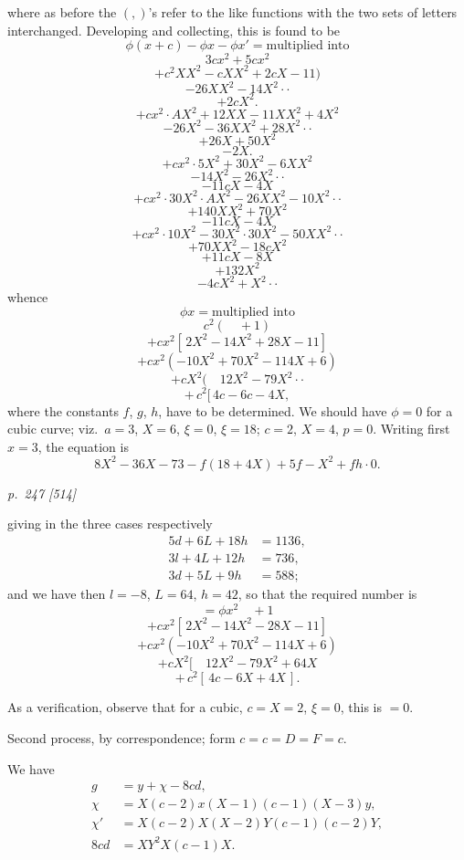 \documentclass[11pt,a4paper]{article}
\theoremstyle{plain}
\theoremstyle{definition}
\begin{document}
\noindent
where as before the $(,)$'s refer to the like functions with the two sets of letters
interchanged.  Developing and collecting, this is found to be
\[
\phi(x + c) - \phi x - \phi x' = \text{multiplied into}
\]
\[
3cx^2 + 5cx^2
\]
\[
+ c^2 X X^2 - cX X^2 + 2cX - 11)
\]
\[
- 26X X^2 - 14X^2 \cdot \cdot
\]
\[
+ 2c X^2.
\]
\[
+ c x^2 \cdot AX^2 + 12X X - 11X X^2 + 4X^2
\]
\[
- 26X^2 - 36X X^2 + 28X^2 \cdot \cdot
\]
\[
+ 26X + 50X^2
\]
\[
- 2X.
\]
\[
+ c x^2 \cdot 5X^2 + 30X^2 - 6X X^2
\]
\[
- 14X^2 - 26X^2 \cdot \cdot
\]
\[
- 11cX - 4X
\]
\[
+ c x^2 \cdot 30X^2 \cdot AX^2 - 26X X^2 - 10X^2 \cdot \cdot
\]
\[
+ 140X X^2 + 70X^2
\]
\[
- 11cX - 4X
\]
\[
+ c x^2 \cdot 10X^2 - 30X^2 \cdot 30X^2 - 50X X^2 \cdot \cdot
\]
\[
+ 70X X^2 - 18cX^2
\]
\[
+ 11cX - 8X
\]
\[
+ 132 X^2
\]
\[
- 4c X^2 + X^2 \cdot \cdot
\]
whence
\[
\phi x = \text{multiplied into}
\]
\[
c^2 (\quad + 1)
\]
\[
+ c x^2[\,2X^2 - 14X^2 + 28X - 11]
\]
\[
+ c x^2 (-10X^2 + 70X^2 - 114X + 6)
\]
\[
+ c X^2 (\quad 12X^2 - 79X^2 \cdot \cdot
\]
\[
+ \,c^2 [\,4c - 6c - 4X,
\]
where the constants $f$, $g$, $h$, have to be determined.  We should have $\phi = 0$ for a
cubic curve; viz.\ $a = 3$, $X = 6$, $\xi = 0$, $\xi = 18$; $c = 2$, $X = 4$, $p = 0$.  Writing first
$x = 3$, the equation is
\[
8X^2 - 36X - 73 - f(18 + 4X) + 5f - X^2 + f h \cdot 0.
\]

\clearpage

\bigskip
\textit{p.~247 [514]}
\smallskip

\noindent
giving in the three cases respectively
\begin{align*}
5d + 6L + 18h &= 1136, \\
3l + 4L + 12h &= 736, \\
3d + 5L + 9h &= 588;
\end{align*}
and we have then $l = -8$, $L = 64$, $h = 42$, so that the required number is
\[
= \phi x^2 \quad + 1
\]
\[
+ c x^2 [\,2X^2 - 14X^2 - 28X - 11]
\]
\[
+ c x^2 (-10X^2 + 70X^2 - 114X + 6)
\]
\[
+ c X^2 [\quad 12X^2 - 79X^2 + 64X
\]
\[
+ \,c^2 [\,4c - 6X + 4X\,].
\]

As a verification, observe that for a cubic, $c = X = 2$, $\xi = 0$, this is $= 0$.

Second process, by correspondence; form $c = c = D = F = c$.

We have
\begin{align*}
g &= y + \chi - 8cd, \\
\chi &= X(c - 2)x(X - 1)(c - 1)(X - 3)y, \\
\chi' &= X(c - 2)X(X - 2)Y(c - 1)(c - 2)Y, \\
8cd &= XY^2 X(c - 1)X.
\end{align*}
\end{document}
